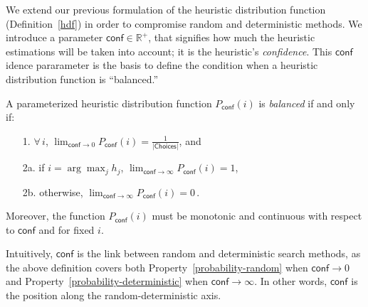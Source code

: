 \documentclass{ws-ijait}
\begin{document}
We extend our previous formulation of the heuristic
distribution function (Definition~\ref{hdf}) in order to
compromise random and deterministic methods. We introduce a
parameter $\mathsf{conf} \in \mathbb{R}^+$, that signifies
how much the heuristic estimations will be taken into
account; it is the heuristic's \emph{confidence}. This
$\mathsf{conf}$idence pararameter is the basis to define the
condition when a heuristic distribution function is
``balanced.''
\begin{definition}
  \label{balanced}
  A parameterized heuristic distribution function
  $P_\mathsf{conf} (i)$ is \emph{balanced} if and only if:
  \begin{enumerate}
    \item[1.] $\forall \, i$, ${\displaystyle
              \lim_{\mathsf{conf} \to 0} } \!\!
              P_\mathsf{conf} (i) =
              \frac{1}{|\mathsf{Choices}|}$, and
    \item[2a.] if $i = \arg\max_j h_j$, ${\displaystyle
               \lim_{\mathsf{conf} \to \infty} } \!\!\!\!
               P_\mathsf{conf} (i) = 1$,
    \item[2b.] otherwise, ${\displaystyle
               \lim_{\mathsf{conf} \to \infty} } \!\!\!\!
               P_\mathsf{conf} (i) = 0 \,$.
  \end{enumerate}
  Moreover, the function $P_\mathsf{conf} (i)$ must be
  monotonic and continuous with respect to $\mathsf{conf}$
  and for fixed $i$.
\end{definition}
Intuitively, $\mathsf{conf}$ is the link between random and
deterministic search methods, as the above definition covers
both Property~\ref{probability-random} when $\mathsf{conf}
\to 0$ and Property~\ref{probability-deterministic} when
$\mathsf{conf} \to \infty$. In other words, $\mathsf{conf}$
is the position along the random-deterministic axis.
\end{document}
